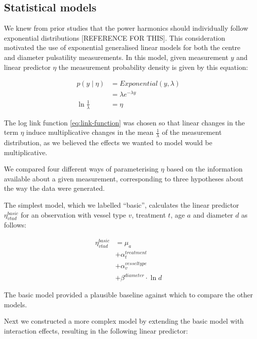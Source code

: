 \documentclass[
  letterpaper,
  DIV=11,
  numbers=noendperiod,
  oneside]{scrartcl}
\theoremstyle{plain}
\theoremstyle{remark}
\begin{document}
\subsection{Statistical models}\label{statistical-models-1}

We knew from prior studies that the power harmonics should individually
follow exponential distributions {[}REFERENCE FOR THIS{]}. This
consideration motivated the use of exponential generalised linear models
for both the centre and diameter pulsatility measurements. In this
model, given measurement \(y\) and linear predictor \(\eta\) the
measurement probability density is given by this equation:

\begin{align}
  p(y\mid\eta) &= Exponential(y, \lambda) \label{eq:pulsatility-measurement-model}  \\
  &= \lambda e^{-\lambda y}  \nonumber \\
  \ln{\frac{1}{\lambda}} &= \eta \label{eq:link-function}
\end{align}

The log link function \eqref{eq:link-function} was chosen so that linear
changes in the term \(\eta\) induce multiplicative changes in the mean
\(\frac{1}
{\lambda}\) of the measurement distribution, as we believed the effects
we wanted to model would be multiplicative.

We compared four different ways of parameterising \(\eta\) based on the
information available about a given measurement, corresponding to three
hypotheses about the way the data were generated.

The simplest model, which we labelled ``basic'', calculates the linear
predictor \(\eta^{basic}_{vtad}\) for an observation with vessel type
\(v\), treatment \(t\), age \(a\) and diameter \(d\) as follows:

\begin{align}
        \label{eq:basic}
    \eta^{basic}_{vtad} &= \mu_{a} \\
      &+ \alpha^{treatment}_{t} \nonumber \\
      &+ \alpha^{vesseltype}_{v} \nonumber \\
      &+ \beta^{diameter} \cdot \ln{d} \nonumber
\end{align}

The basic model provided a plausible baseline against which to compare
the other models.

Next we constructed a more complex model by extending the basic model
with interaction effects, resulting in the following linear predictor:
\end{document}
